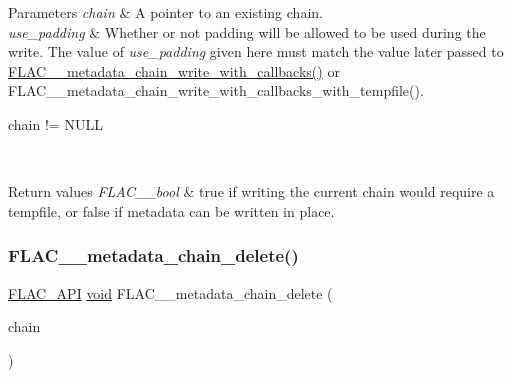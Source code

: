 \begin{DoxyParams}{Parameters}
{\em chain} & A pointer to an existing chain. \\
\hline
{\em use\+\_\+padding} & Whether or not padding will be allowed to be used during the write. The value of {\itshape use\+\_\+padding} given here must match the value later passed to \hyperlink{group__flac__metadata__level2_ga6bf7552940ec2242718d1ab164b89e03}{F\+L\+A\+C\+\_\+\+\_\+metadata\+\_\+chain\+\_\+write\+\_\+with\+\_\+callbacks()} or F\+L\+A\+C\+\_\+\+\_\+metadata\+\_\+chain\+\_\+write\+\_\+with\+\_\+callbacks\+\_\+with\+\_\+tempfile().  
\begin{DoxyCode}
chain != NULL 
\end{DoxyCode}
 \\
\hline
\end{DoxyParams}

\begin{DoxyRetVals}{Return values}
{\em F\+L\+A\+C\+\_\+\+\_\+bool} & {\ttfamily true} if writing the current chain would require a tempfile, or {\ttfamily false} if metadata can be written in place. \\
\hline
\end{DoxyRetVals}
\mbox{\label{group__flac__metadata__level2_ga178898eef72ba9d569b1964fffcb4a8b}} 
\subsubsection{\texorpdfstring{F\+L\+A\+C\+\_\+\+\_\+metadata\+\_\+chain\+\_\+delete()}{FLAC\_\_metadata\_chain\_delete()}}
{\footnotesize\ttfamily \hyperlink{group__flac__export_ga56ca07df8a23310707732b1c0007d6f5}{F\+L\+A\+C\+\_\+\+A\+PI} \hyperlink{png_8h_ac9c84fa68bbad002983e35ce3663c686}{void} F\+L\+A\+C\+\_\+\+\_\+metadata\+\_\+chain\+\_\+delete (\begin{DoxyParamCaption}\item[{\hyperlink{group__flac__metadata__level2_gaec6993c60b88f222a52af86f8f47bfdf}{F\+L\+A\+C\+\_\+\+\_\+\+Metadata\+\_\+\+Chain} $\ast$}]{chain }\end{DoxyParamCaption})}

